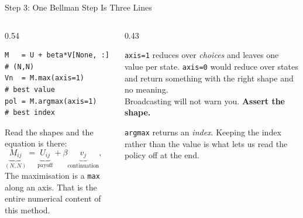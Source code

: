 \begin{frame}[fragile]{Step 3: One Bellman Step Is Three Lines}
\begin{columns}[T]
\begin{column}{0.54\textwidth}
\begin{lstlisting}
M   = U + beta*V[None, :]   # (N,N)
Vn  = M.max(axis=1)         # best value
pol = M.argmax(axis=1)      # best index
\end{lstlisting}
\vspace{-1mm}
\small
Read the shapes and the equation is there:
\[
  \underbrace{M_{ij}}_{(N,N)}=\underbrace{U_{ij}}_{\text{payoff}}+\beta\underbrace{v_j}_{\text{continuation}},
  \qquad v^{\text{new}}_i=\max_j M_{ij}.
\]
The maximisation is a \texttt{max} along an axis. That is the entire numerical content of this method.
\end{column}
\begin{column}{0.43\textwidth}
\begin{cautionbox}[title=\textbf{The axis is the whole game}]\footnotesize
\texttt{axis=1} reduces over \emph{choices} and leaves one value per state. \texttt{axis=0} would reduce over states and return something with the right shape and no meaning.\\[1mm]
Broadcasting will not warn you. \textbf{Assert the shape.}
\end{cautionbox}
\medskip
\begin{examplebox}\footnotesize
\texttt{argmax} returns an \emph{index}. Keeping the index rather than the value is what lets us read the policy off at the end.
\end{examplebox}
\end{column}
\end{columns}
\end{frame}

